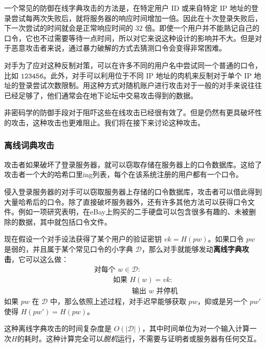 一个常见的防御在线字典攻击的方法是，在特定用户 ID 或来自特定 IP 地址的登录尝试每两次失败后，就将服务器的响应时间增加一倍。因此在十次登录失败后，下一次尝试的时间就会是正常响应时间的 $32$ 倍。即使一个用户并不能熟记自己的口令，它也不过需要等待一点时间，所以对它来说这种设计的影响并不大。但是对于恶意攻击者来说，通过暴力破解的方式去猜测口令会变得非常困难。

对手为了应对这种反制对策，可以在许多不同的用户名中尝试同一个普通的口令，比如 $\mathtt{123456}$。此外，对手可以利用位于不同 IP 地址的肉机来反制对于单个 IP 地址的登录尝试次数限制。用这种方式对随机账户进行攻击对于一般的对手来说往往已经足够了，他们通常会在地下论坛中交易攻击得到的数据。

非密码学的防御手段对于阻吓这些在线攻击已经很有效了。但是仍然有更具破坏性的攻击，这种攻击也更难阻止。我们将在接下来讨论这种攻击。

\subsubsection{离线词典攻击}\label{subsubsec:18-3-1-2}

攻击者如果破坏了登录服务器，就可以窃取存储在服务器上的口令数据库。这给了攻击者一个大的哈希口里ing列表，每个在该系统注册的用户都有一个口令。

侵入登录服务器的对手可以窃取服务器上存储的口令数据库，攻击者可以借此得到大量哈希后的口令。除了直接破坏服务器外，还有许多其他方法可以获得口令文件。例如一项研究表明，在eBay上购买的二手硬盘可以包含很多有趣的、未被删除的数据，其中就包括口令文件。

现在假设一个对手设法获得了某个用户的验证密钥 $vk=H(pw)$。如果口令 $pw$ 是弱的，并且属于某个常见口令的小字典 $\mathcal{D}$，那么对手就能够发动\textbf{离线字典攻击}，它可以这么做：
\begin{equation}\label{eq:18-1}
	\begin{aligned}
		& \text{对每个~}w\in\mathcal{D}:\\
		& \text{~~~~~~~~如果~}H(w)=vk:\\
		& \text{~~~~~~~~~~~~~~~~输出~} w \text{ 并停机}
	\end{aligned}
\end{equation}
如果 $pw$ 在 $\mathcal{D}$ 中，那么依照上述过程，对手迟早能够获取 $pw$，抑或是另一个 $pw'$ 使得 $H(pw')=H(pw)$。

这种离线字典攻击的时间复杂度是 $O(|\mathcal{D}|)$，其中时间单位为对一个输入计算一次$H$的耗时。这种计算完全可以\emph{脱机}运行，不需要与证明者或服务器有任何交互。


